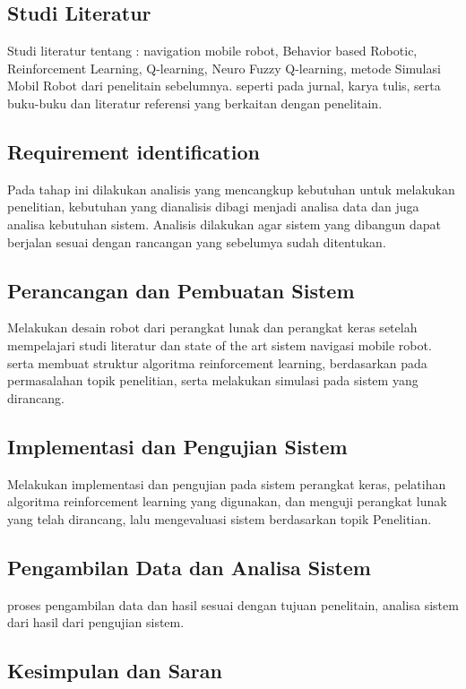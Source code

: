 \subsection{Studi Literatur}
Studi literatur tentang :
navigation mobile robot, Behavior based Robotic,  Reinforcement Learning, 
Q-learning, Neuro Fuzzy Q-learning, metode Simulasi Mobil Robot dari penelitain sebelumnya.
seperti pada jurnal, karya tulis, serta buku-buku dan literatur referensi yang berkaitan dengan penelitain.

\subsection{Requirement identification}

Pada tahap ini dilakukan analisis yang mencangkup kebutuhan untuk melakukan penelitian, 
kebutuhan yang dianalisis dibagi menjadi analisa data dan juga analisa kebutuhan sistem. 
Analisis dilakukan agar sistem yang dibangun dapat berjalan sesuai dengan rancangan yang sebelumya sudah ditentukan.

\subsection{Perancangan dan Pembuatan Sistem}
Melakukan desain robot dari perangkat lunak dan perangkat keras setelah mempelajari studi literatur dan state of the art
sistem navigasi mobile robot. serta membuat struktur algoritma reinforcement learning, 
berdasarkan pada permasalahan topik penelitian, serta melakukan simulasi pada sistem 
yang dirancang.

\subsection{Implementasi dan Pengujian Sistem}
Melakukan implementasi dan pengujian pada sistem perangkat keras,
pelatihan algoritma reinforcement learning yang digunakan, 
dan menguji perangkat lunak yang telah dirancang, lalu mengevaluasi sistem
berdasarkan topik Penelitian.


\subsection{Pengambilan Data dan Analisa Sistem}
proses pengambilan data dan hasil sesuai dengan tujuan penelitain,
analisa sistem dari hasil dari pengujian sistem.
\subsection{Kesimpulan dan Saran}

